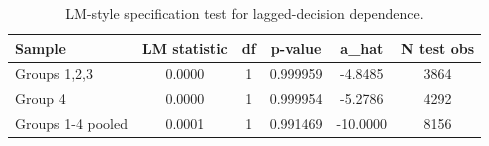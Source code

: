 \begin{table}[htbp]
\centering
\caption{LM-style specification test for lagged-decision dependence.}
\label{tab:rust\_simplified\_lm\_test}
\begin{tabular}{lccccc}
\toprule
Sample & LM statistic & df & p-value & a\_hat & N test obs \\
\midrule
Groups 1,2,3 & 0.0000 & 1 & 0.999959 & -4.8485 & 3864 \\
Group 4 & 0.0000 & 1 & 0.999954 & -5.2786 & 4292 \\
Groups 1-4 pooled & 0.0001 & 1 & 0.991469 & -10.0000 & 8156 \\
\bottomrule
\end{tabular}
\end{table}